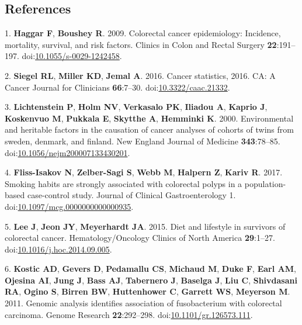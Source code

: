 \documentclass[11pt,]{article}
\begin{document}
\newpage

\subsection{References}\label{references}

\hypertarget{refs}{}
\hypertarget{ref-Haggar2009}{}
1. \textbf{Haggar F}, \textbf{Boushey R}. 2009. Colorectal cancer
epidemiology: Incidence, mortality, survival, and risk factors. Clinics
in Colon and Rectal Surgery \textbf{22}:191--197.
doi:\href{https://doi.org/10.1055/s-0029-1242458}{10.1055/s-0029-1242458}.

\hypertarget{ref-Siegel2016}{}
2. \textbf{Siegel RL}, \textbf{Miller KD}, \textbf{Jemal A}. 2016.
Cancer statistics, 2016. CA: A Cancer Journal for Clinicians
\textbf{66}:7--30.
doi:\href{https://doi.org/10.3322/caac.21332}{10.3322/caac.21332}.

\hypertarget{ref-Lichtenstein2000}{}
3. \textbf{Lichtenstein P}, \textbf{Holm NV}, \textbf{Verkasalo PK},
\textbf{Iliadou A}, \textbf{Kaprio J}, \textbf{Koskenvuo M},
\textbf{Pukkala E}, \textbf{Skytthe A}, \textbf{Hemminki K}. 2000.
Environmental and heritable factors in the causation of cancer analyses
of cohorts of twins from sweden, denmark, and finland. New England
Journal of Medicine \textbf{343}:78--85.
doi:\href{https://doi.org/10.1056/nejm200007133430201}{10.1056/nejm200007133430201}.

\hypertarget{ref-FlissIsakov2017}{}
4. \textbf{Fliss-Isakov N}, \textbf{Zelber-Sagi S}, \textbf{Webb M},
\textbf{Halpern Z}, \textbf{Kariv R}. 2017. Smoking habits are strongly
associated with colorectal polyps in a population-based case-control
study. Journal of Clinical Gastroenterology 1.
doi:\href{https://doi.org/10.1097/mcg.0000000000000935}{10.1097/mcg.0000000000000935}.

\hypertarget{ref-Lee2015}{}
5. \textbf{Lee J}, \textbf{Jeon JY}, \textbf{Meyerhardt JA}. 2015. Diet
and lifestyle in survivors of colorectal cancer. Hematology/Oncology
Clinics of North America \textbf{29}:1--27.
doi:\href{https://doi.org/10.1016/j.hoc.2014.09.005}{10.1016/j.hoc.2014.09.005}.

\hypertarget{ref-Kostic2011}{}
6. \textbf{Kostic AD}, \textbf{Gevers D}, \textbf{Pedamallu CS},
\textbf{Michaud M}, \textbf{Duke F}, \textbf{Earl AM}, \textbf{Ojesina
AI}, \textbf{Jung J}, \textbf{Bass AJ}, \textbf{Tabernero J},
\textbf{Baselga J}, \textbf{Liu C}, \textbf{Shivdasani RA},
\textbf{Ogino S}, \textbf{Birren BW}, \textbf{Huttenhower C},
\textbf{Garrett WS}, \textbf{Meyerson M}. 2011. Genomic analysis
identifies association of fusobacterium with colorectal carcinoma.
Genome Research \textbf{22}:292--298.
doi:\href{https://doi.org/10.1101/gr.126573.111}{10.1101/gr.126573.111}.
\end{document}
